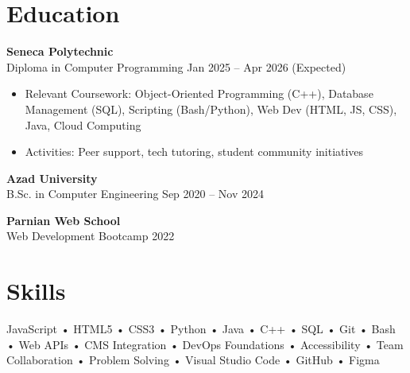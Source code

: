 \documentclass[letterpaper,11pt]{article}
\begin{document}
\vspace{0.6em}

\section*{Education}
\textbf{Seneca Polytechnic}\\
Diploma in Computer Programming \hfill Jan 2025 -- Apr 2026 (Expected)
\begin{itemize}[leftmargin=*]
  \item Relevant Coursework: Object-Oriented Programming (C++), Database Management (SQL), Scripting (Bash/Python), Web Dev (HTML, JS, CSS), Java, Cloud Computing
  \item Activities: Peer support, tech tutoring, student community initiatives
\end{itemize}

\textbf{Azad University}\\
B.Sc. in Computer Engineering \hfill Sep 2020 -- Nov 2024

\textbf{Parnian Web School}\\
Web Development Bootcamp \hfill 2022

\vspace{0.6em}

\section*{Skills}
JavaScript • HTML5 • CSS3 • Python • Java • C++ • SQL • Git • Bash • Web APIs • CMS Integration • DevOps Foundations • Accessibility • Team Collaboration • Problem Solving • Visual Studio Code • GitHub • Figma
\end{document}
